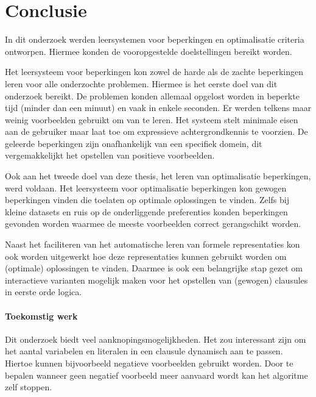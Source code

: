 



\section{Conclusie}
In dit onderzoek werden leersystemen voor beperkingen en optimalisatie criteria ontworpen.
Hiermee konden de vooropgestelde doelstellingen bereikt worden.

Het leersysteem voor beperkingen kon zowel de harde als de zachte beperkingen leren voor alle onderzochte problemen.
Hiermee is het eerste doel van dit onderzoek bereikt.
De problemen konden allemaal opgelost worden in beperkte tijd (minder dan een minuut) en vaak in enkele seconden.
Er werden telkens maar weinig voorbeelden gebruikt om van te leren.
Het systeem stelt minimale eisen aan de gebruiker maar laat toe om expressieve achtergrondkennis te voorzien.
De geleerde beperkingen zijn onafhankelijk van een specifiek domein, dit vergemakkelijkt het opstellen van positieve voorbeelden.

Ook aan het tweede doel van deze thesis, het leren van optimalisatie beperkingen, werd voldaan.
Het leersysteem voor optimalisatie beperkingen kon gewogen beperkingen vinden die toelaten op optimale oplossingen te vinden.
Zelfs bij kleine datasets en ruis op de onderliggende preferenties konden beperkingen gevonden worden waarmee de meeste voorbeelden correct gerangschikt worden.

Naast het faciliteren van het automatische leren van formele representaties kon ook worden uitgewerkt hoe deze representaties kunnen gebruikt worden om (optimale) oplossingen te vinden.
Daarmee is ook een belangrijke stap gezet om interactieve varianten mogelijk maken voor het opstellen van (gewogen) clausules in eerste orde logica. 

\paragraph{Toekomstig werk}
Dit onderzoek biedt veel aanknopingsmogelijkheden.
Het zou interessant zijn om het aantal variabelen en literalen in een clausule dynamisch aan te passen.
Hiertoe kunnen bijvoorbeeld negatieve voorbeelden gebruikt worden.
Door te bepalen wanneer geen negatief voorbeeld meer aanvaard wordt kan het algoritme zelf stoppen.

